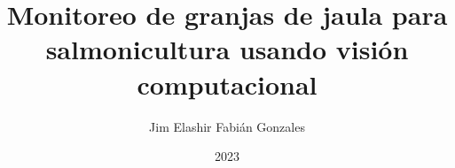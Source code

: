 \documentclass[a4paper,12pt,oneside]{tesisutec}
\begin{document}
\frontmatter

\department{}

\title{Monitoreo de granjas de jaula para salmonicultura usando visión computacional}

\author{Jim Elashir Fabián Gonzales } %

\date{2023}

\maketitle



% 
% 

\tableofcontents

\newpage


\newpage



\mainmatter
\pagestyle{fancy}


 



% 


% 

\renewcommand{\bibname}{\hfill\Large\bf{REFERENCIAS BIBLIOGRÁFICAS}\hfill}




\end{document}
